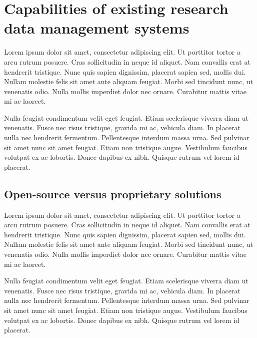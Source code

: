 
\section{Capabilities of existing research data management systems} %
\label{sec:capabilities_of_existing_research_data_management_systems}

Lorem ipsum dolor sit amet, consectetur adipiscing elit. Ut porttitor tortor a arcu rutrum posuere. Cras sollicitudin in neque id aliquet. Nam convallis erat at hendrerit tristique. Nunc quis sapien dignissim, placerat sapien sed, mollis dui. Nullam molestie felis sit amet ante aliquam feugiat. Morbi sed tincidunt nunc, ut venenatis odio. Nulla mollis imperdiet dolor nec ornare. Curabitur mattis vitae mi ac laoreet.

Nulla feugiat condimentum velit eget feugiat. Etiam scelerisque viverra diam ut venenatis. Fusce nec risus tristique, gravida mi ac, vehicula diam. In placerat nulla nec hendrerit fermentum. Pellentesque interdum massa urna. Sed pulvinar sit amet nunc sit amet feugiat. Etiam non tristique augue. Vestibulum faucibus volutpat ex ac lobortis. Donec dapibus ex nibh. Quisque rutrum vel lorem id placerat.

\subsection{Open-source versus proprietary solutions} %
\label{sub:open_source_versus_proprietary_solutions}

Lorem ipsum dolor sit amet, consectetur adipiscing elit. Ut porttitor tortor a arcu rutrum posuere. Cras sollicitudin in neque id aliquet. Nam convallis erat at hendrerit tristique. Nunc quis sapien dignissim, placerat sapien sed, mollis dui. Nullam molestie felis sit amet ante aliquam feugiat. Morbi sed tincidunt nunc, ut venenatis odio. Nulla mollis imperdiet dolor nec ornare. Curabitur mattis vitae mi ac laoreet.

Nulla feugiat condimentum velit eget feugiat. Etiam scelerisque viverra diam ut venenatis. Fusce nec risus tristique, gravida mi ac, vehicula diam. In placerat nulla nec hendrerit fermentum. Pellentesque interdum massa urna. Sed pulvinar sit amet nunc sit amet feugiat. Etiam non tristique augue. Vestibulum faucibus volutpat ex ac lobortis. Donec dapibus ex nibh. Quisque rutrum vel lorem id placerat.

